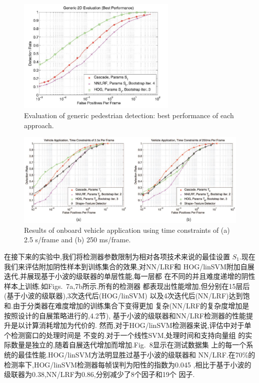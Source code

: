 \documentclass[10pt,letterpaper,journal,compsoc]{IEEEtran}
\begin{document}
\begin{figure}[!t]
\centering
\includegraphics[width=3in]{fig8.JPG}
\caption{Evaluation of generic pedestrian detection: best performance of
each approach.}
\end{figure}
\begin{figure}[!t]
\centering
\includegraphics[width=7in]{fig9.JPG}
\caption{Results of onboard vehicle application using time constraints of (a) 2.5 s/frame and (b) 250 ms/frame.
}
\end{figure}

在接下来的实验中,我们将检测器参数限制为相对各项技术来说的最佳设置
$S_1$.现在我们来评估附加阴性样本到训练集合的效果,对NN/LRF和
HOG/linSVM附加自展迭代,并展现基于小波的级联器的单层性能,每一层都
在不同的并且难度递增的阴性样本上训练.如Figs.~7a,7b所示.所有的检测器
都表现出性能增加,但分别在15层后(基于小波的级联器),3次迭代后(HOG/linSVM)
以及4次迭代后(NN/LRF)达到饱和.由于分类器在难度增加的训练集合下变得更加
复杂(NN/LRF的复杂度增加是按照设计的自展策略进行的,4.2节),
基于小波的级联器和NN/LRF检测器的性能提升是以计算消耗增加为代价的.
然而,对于HOG/linSVM检测器来说,评估中对于单个检测窗口的处理时间是
不变的.对于一个线性SVM,处理时间和支持向量组\cite{bib78}
的实际数量是独立的,随着自展迭代增加而增加.Fig.~8显示在测试数据集
上的每一个系统的最佳性能.HOG/linSVM方法明显胜过基于小波的级联器和
NN/LRF.在70\%的检测率下,HOG/linSVM检测器每帧误判为阳性的指数为0.045
,相比于基于小波的级联器为0.38,NN/LRF为0.86,分别减少了8个因子和19个
因子.
\end{document}
